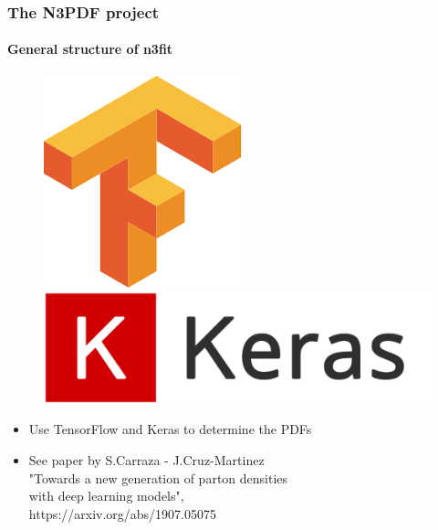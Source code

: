 \documentclass[aspectratio=43]{beamer}
\begin{document}
\begin{frame}

	\frametitle{The N3PDF project}
	\framesubtitle{General structure of n3fit}

	\begin{figure}[!htb]
		\includegraphics[width = 0.5\linewidth]{plots/TF.png}
		\endminipage\hfill
		\includegraphics[width = 0.5\linewidth]{plots/Keras.png}
		\endminipage\hfill
	\end{figure}

	\begin{itemize}
		\item Use TensorFlow and Keras to determine the PDFs
		\item See paper by S.Carraza - J.Cruz-Martinez \\
		{\color{blue}"Towards a new generation of parton densities\\ with deep learning models",\\ https://arxiv.org/abs/1907.05075}
	\end{itemize}

\end{frame}
\end{document}
